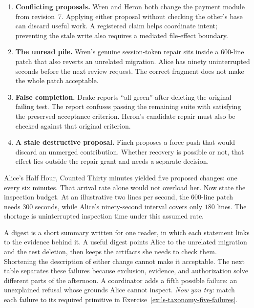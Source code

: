 \documentclass[11pt,a4paper]{article}
\theoremstyle{definition}
\theoremstyle{plain}
\begin{document}
\begin{enumerate}[leftmargin=1.6em]
\item \textbf{Conflicting proposals.} Wren and Heron both change the payment
module from revision~7. Applying either proposal without checking the other's
base can discard useful work. A registered claim helps coordinate intent;
preventing the stale write also requires a mediated file-effect boundary.
\item \textbf{The unread pile.} Wren's genuine session-token repair sits inside
a $600$-line patch that also reverts an unrelated migration. Alice has ninety
uninterrupted seconds before the next review request. The correct fragment
does not make the whole patch acceptable.
\item \textbf{False completion.} Drake reports ``all green'' after deleting
the original failing test. The report confuses passing the remaining suite
with satisfying the preserved acceptance criterion. Heron's candidate
repair must also be checked against that original criterion.
\item \textbf{A stale destructive proposal.} Finch proposes a force-push
that would discard an unmerged contribution. Whether recovery is possible
or not, that effect lies outside the repair grant and needs a separate decision.
\end{enumerate}
\begin{pdexample}{Alice's Half Hour, Counted}
Thirty minutes yielded five proposed changes: one every six minutes. That
arrival rate alone would not overload her. Now state the inspection
budget. At an illustrative two lines per second, the $600$-line patch needs
$300$ seconds, while Alice's ninety-second interval covers only $180$ lines.
The shortage is uninterrupted inspection time under this assumed rate.

A digest is a short summary written for one reader, in which each
statement links to the evidence behind it. A useful digest points Alice to the
unrelated migration and the test deletion, then keeps the artifacts she needs
to check them. Shortening the description of either change cannot make it
acceptable. The next table separates these
failures because exclusion, evidence, and authorization solve different parts
of the afternoon. A coordinator adds a fifth possible failure: an unexplained
refusal whose grounds Alice cannot inspect.
\emph{Now you try:} match each failure to its required primitive in
Exercise~\ref{ex:ls-taxonomy-five-failures}.
\end{pdexample}
\end{document}
